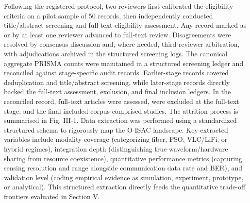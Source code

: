 \markdownRendererOlEndTight \markdownRendererInterblockSeparator
{}Following the registered protocol, two reviewers first calibrated the eligibility criteria on a pilot sample of 50 records, then independently conducted title/abstract screening and full-text eligibility assessment. Any record marked as  or  by at least one reviewer advanced to full-text review. Disagreements were resolved by consensus discussion and, where needed, third-reviewer arbitration, with adjudications archived in the structured screening logs.\markdownRendererParagraphSeparator
{}The canonical aggregate PRISMA counts were maintained in a structured screening ledger and reconciled against stage-specific audit records. Earlier-stage records covered deduplication and title/abstract screening, while later-stage records directly backed the full-text assessment, exclusion, and final inclusion ledgers. In the reconciled record,  full-text articles were assessed,  were excluded at the full-text stage, and the final included corpus comprised  studies. The attrition process is summarised in Fig. III-1.\markdownRendererInterblockSeparator
{}\markdownRendererInterblockSeparator
{}\markdownRendererInterblockSeparator
{}
\markdownRendererSectionEnd \markdownRendererSectionBegin
{}\markdownRendererInterblockSeparator
{}Data extraction was performed using a standardized structured schema to rigorously map the O-ISAC landscape. Key extracted variables include modality coverage (categorizing fiber, FSO, VLC/LiFi, or hybrid regimes), integration depth (distinguishing true waveform/hardware sharing from resource coexistence), quantitative performance metrics (capturing sensing resolution and range alongside communication data rate and BER), and validation level (coding empirical evidence as simulation, experiment, prototype, or analytical). This structured extraction directly feeds the quantitative trade-off frontiers evaluated in Section V.\markdownRendererInterblockSeparator
{}
\markdownRendererSectionEnd \markdownRendererSectionBegin
{}\markdownRendererInterblockSeparator
